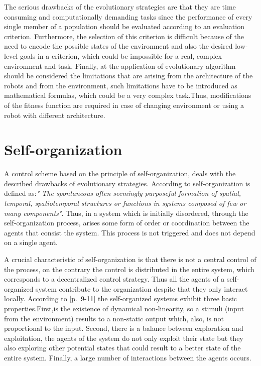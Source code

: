 \documentclass[msc,ai,logo]{infthesis}
\begin{document}
The serious drawbacks of the evolutionary strategies are that they are time consuming and computationally demanding tasks \citep{Nolfi200231} since the performance of every single member of a population should be evaluated according to an evaluation criterion. Furthermore, the selection of this criterion is difficult because of the need to encode the possible states of the environment and also the desired low-level goals in a criterion, which could be impossible for a real, complex environment and task. Finally, at the application of evolutionary algorithm should be considered the limitations that are arising from the architecture of the robots and from the environment, such limitations have to be introduced as mathematical formulas, which could be a very complex task.Thus, modifications of the fitness function are required in case of changing environment or using a robot with different architecture.     

\section{Self-organization}
\label{s:SO}
A control scheme based on the principle of self-organization, deals with the described drawbacks of evolutionary strategies. According  to \cite{Haken:2008} self-organization is defined as:\textit{" The spontaneous often seemingly purposeful formation of spatial, temporal, spatiotemporal structures or functions in systems composed of few or many components"}. Thus, in a system which is initially disordered, through the self-organization process, arises some form of order or coordination between the agents that consist the system. This process is not triggered and does not depend on a single agent. 

A crucial characteristic of self-organization is that there is not a central control of the process, on the contrary the control is distributed in the entire system, which corresponds to a decentralized control strategy. Thus all the agents of a self-organized system contribute to the organization despite that they only interact locally. According to \cite  {Bonabeau:1999} [p.~9-11]  the self-organized systems exhibit three basic properties.First,is the existence of dynamical non-linearity, so a stimuli (input from the environment) results to a non-static output which, also, is not proportional to the input. Second, there is a balance between exploration and exploitation, the agents of the system do not only exploit their state  but they also exploring other potential states that could result to     a better state of the entire system. Finally, a large number of interactions between the agents occurs.     
\end{document}
